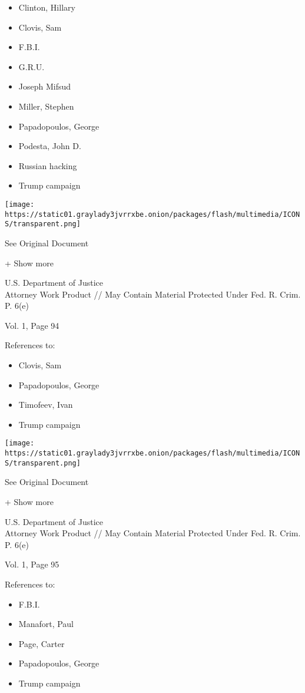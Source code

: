 \begin{itemize}
\tightlist
\item
  Clinton, Hillary
\item
  Clovis, Sam
\item
  F.B.I.
\item
  G.R.U.
\item
  Joseph Mifsud
\item
  Miller, Stephen
\item
  Papadopoulos, George
\item
  Podesta, John D.
\item
  Russian hacking
\item
  Trump campaign
\end{itemize}

\protect\hyperlink{}{}

\texttt{[image: https://static01.graylady3jvrrxbe.onion/packages/flash/multimedia/ICONS/transparent.png]}

See Original Document

+ Show more

U.S. Department of Justice\\
Attorney Work Product // May Contain Material Protected Under Fed. R.
Crim. P. 6(e)

Vol. 1, Page 94

References to:

\begin{itemize}
\tightlist
\item
  Clovis, Sam
\item
  Papadopoulos, George
\item
  Timofeev, Ivan
\item
  Trump campaign
\end{itemize}

\protect\hyperlink{}{}

\texttt{[image: https://static01.graylady3jvrrxbe.onion/packages/flash/multimedia/ICONS/transparent.png]}

See Original Document

+ Show more

U.S. Department of Justice\\
Attorney Work Product // May Contain Material Protected Under Fed. R.
Crim. P. 6(e)

Vol. 1, Page 95

References to:

\begin{itemize}
\tightlist
\item
  F.B.I.
\item
  Manafort, Paul 
\item
  Page, Carter
\item
  Papadopoulos, George
\item
  Trump campaign
\end{itemize}

